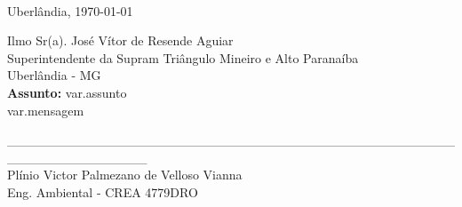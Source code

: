 \documentclass[12pt,a4paper,oneside,sumario=tradicional,brazil]{abntex2}
\begin{document}
	\textual
	\pagestyle{LRA}
	
	\
	
	\begin{flushright}
		Uberlândia, \today
	\end{flushright}
	
	
	\noindent
	Ilmo Sr(a). José Vítor de Resende Aguiar \\ %
	Superintendente da Supram Triângulo Mineiro e Alto Paranaíba \\
	Uberlândia - MG \\
	
	\textbf{Assunto:} var.assunto \\
	
		var.mensagem
	
	\begin{center}
		\_\_\_\_\_\_\_\_\_\_\_\_\_\_\_\_\_\_\_\_\_\_\_\_\_\_\_\_\_\_\_\_\_\_\_\_\_\_\_\_\_\_\_\_\_\_\_\_\_\_\_\_\_\_\_\_\_\_\_\_\_\_\_ \\
		Plínio Victor Palmezano de Velloso Vianna \\
		Eng. Ambiental - CREA 4779DRO \\
	\end{center}
	
	
\end{document}

